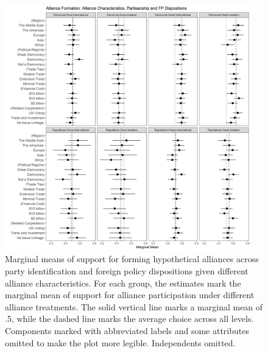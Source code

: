 \documentclass[12pt]{article}
\begin{document}
\begin{figure}
	\centering
		\includegraphics[width=0.95\textwidth]{party-dispo-form-char.png}
	\caption{Marginal means of support for forming hypothetical alliances across party identification and foreign policy dispositions given different alliance characteristics. For each group, the estimates mark the marginal mean of support for alliance participation under different alliance treatments. The solid vertical line marks a marginal mean of .5, while the dashed line marks the average choice across all levels. Components marked with abbreviated labels and some attributes omitted to make the plot more legible. Independents omitted.}
	\label{fig:party-dispo-form-char}
\end{figure}
\end{document}

